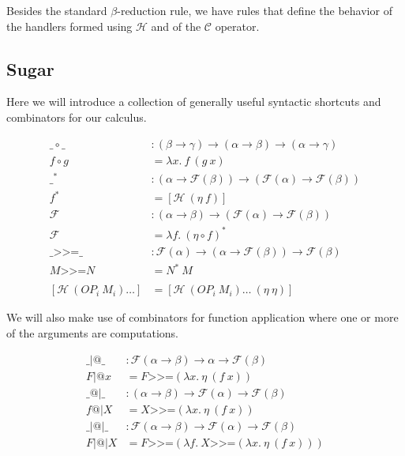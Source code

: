 \documentclass{article}
\makeatletter
\newcommand{\hsbind}{\mathbin{\texttt{>>=}}}
\newcommand{\ap}{\mathbin{|@|}}
\newcommand{\apl}{\mathbin{|@}}
\newcommand{\apr}{\mathbin{@|}}
\makeatother
\begin{document}
\vspace{3mm}

Besides the standard $\beta$-reduction rule, we have rules that define the
behavior of the handlers formed using $\mathcal{H}$ and of the
$\mathcal{C}$ operator.


\subsection{Sugar}

Here we will introduce a collection of generally useful syntactic shortcuts
and combinators for our calculus.

\begin{align*}
  \_ \circ \_ &: (\beta \to \gamma) \to (\alpha \to \beta) \to (\alpha \to \gamma) \\
  f \circ g &= \lambda x.\ f\ (g\ x) \\
  \_^* &: (\alpha \to \mathcal{F}(\beta)) \to (\mathcal{F}(\alpha) \to \mathcal{F}(\beta)) \\
  f^* &= [\mathcal{H}\ (\eta\ f)] \\
  \mathcal{F} &: (\alpha \to \beta) \to (\mathcal{F}(\alpha) \to \mathcal{F}(\beta)) \\
  \mathcal{F} &= \lambda f.\ (\eta \circ f)^* \\
  \_ \hsbind \_ &: \mathcal{F}(\alpha) \to (\alpha \to \mathcal{F}(\beta)) \to \mathcal{F}(\beta) \\
  M \hsbind N &= N^*\ M \\
  \\
  [\mathcal{H}\ (OP_i\ M_i)\ldots] &= [\mathcal{H}\ (OP_i\ M_i)\ldots\ (\eta\ \eta)]
\end{align*}

We will also make use of combinators for function application where one or
more of the arguments are computations.

\begin{align*}
  \_ \apl \_ &: \mathcal{F}(\alpha \to \beta) \to \alpha \to \mathcal{F}(\beta) \\
  F \apl x &= F \hsbind (\lambda x.\ \eta\ (f\ x)) \\
  \_ \apr \_ &: (\alpha \to \beta) \to \mathcal{F}(\alpha) \to \mathcal{F}(\beta) \\
  f \apr X &= X \hsbind (\lambda x.\ \eta\ (f\ x)) \\
  \_ \ap \_ &: \mathcal{F}(\alpha \to \beta) \to \mathcal{F}(\alpha) \to \mathcal{F}(\beta) \\
  F \ap X &= F \hsbind (\lambda f.\ X \hsbind (\lambda x.\ \eta\ (f\ x)))
\end{align*}
\end{document}
